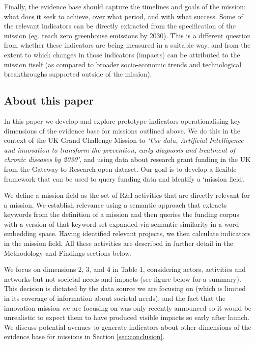 \documentclass[11pt]{article}
\begin{document}
Finally, the evidence base should capture the time\-lines and goals of the mission: what does it seek to achieve, over what period, and with what success. Some of the relevant indicators can be directly extracted from the specification of the mission (eg. reach zero greenhouse emissions by 2030). This is a different question from whether these indicators are being measured in a suitable way, and from the extent to which changes in those indicators (impacts) can be attributed to the mission itself (as compared to broader socio-economic trends and technological breakthroughs supported outside of the mission). 

\subsection{About this paper}
\label{subsec: about}

In this paper we develop and explore prototype indicators operationalising key dimensions of the evidence base for missions outlined above. We do this in the context of the UK Grand Challenge Mission to \textit{`Use data, Artificial Intelligence and innovation to transform the prevention, early diagnosis and treatment of chronic diseases by 2030'}, and using data about research grant funding in the UK from the Gateway to Research open dataset. Our goal is to develop a flexible framework that can be used to query funding data and identify a `mission field'. 

We define a mission field as the set of R&I activities that are directly relevant for a mission. We establish relevance using a semantic approach that extracts keywords from the definition of a mission and then queries the funding corpus with a version of that keyword set expanded via semantic similarity in a word embedding space. Having identified relevant projects, we then calculate indicators in the mission field. All these activities are described in further detail in the Methodology and Findings sections below.

We focus on dimensions 2, 3, and 4 in Table 1, considering actors, activities and networks but not societal needs and impacts (see figure below for a summary). This decision is dictated by the data source we are focusing on (which is limited in its coverage of information about societal needs), and the fact that the innovation mission we are focusing on was only recently announced so it would be unrealistic to expect them to have produced visible impacts so early after launch. We discuss potential avenues to generate indicators about other dimensions of the evidence base for missions in Section \ref{sec:conclusion}.
\end{document}
